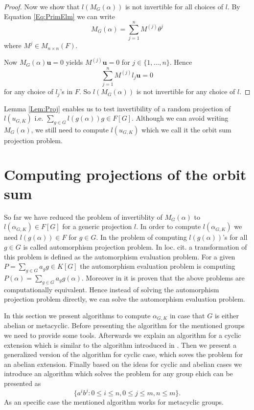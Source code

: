 \documentclass[sigconf]{acmart}
\newcommand{\osum}[2]{\alpha_{#1,#2}}
\theoremstyle{acmplain}
\begin{document}
\begin{proof}
 
 Now we show that $l(M_G(\alpha))$ is not invertible for all
 choices of $l$. By Equation \ref{Eq:PrimElm} we can write 
 $$M_G(\alpha) = \sum_{j = 1}^n M^{(j)} \theta^j$$ 
 where $M^{j} \in M_{n \times n}(F)$. 
 
 Now $M_G(\alpha) \textbf{u} =0$ yields $M^{(j)}\textbf{u} = 0$ for $j \in \lbrace 1, \ldots , n \rbrace$. Hence
 $$\sum_{j = 1}^n M^{(j)} l_j \textbf{u} = 0$$ for any choice of $l_j$'s in $F$. So $l(M_G(\alpha))$ is not invertible for any choice of $l$.
\end{proof} 
Lemma \ref{Lem:Proj} enables us to test invertibility of a random projection of $l(u_{G,K}) $ i.e. $\sum_{g \in G}
 l(g(\alpha))g \in F[G]$. Although we can avoid writing $M_G(\alpha)$, we still need to compute $l(u_{G,K})$ which
 we call it the orbit sum projection problem.


\section{Computing projections of the orbit sum}\label{sec:osum}

So far we have reduced the problem of invertiblity of $M_G(\alpha)$ to $l(\osum{G}{K}) \in F[G]$ for a generic
projection $l$. In order to compute $l(\osum{G}{K})$ we need $l(g(\alpha)) \in F$ for $g \in G$. In \cite{Kaltofen} the problem of
computing $l(g(\alpha))$'s for all $g \in G$ is called automorphism projection problem. In loc. cit. a transformation of this problem
is defined as the automorphism evaluation problem. For a given $P = \sum_{g \in G}a_g g \in K[G]$ the automorphism evaluation problem
is computing $P(\alpha) = \sum_{g \in G}a_g g(\alpha)$. Moreover in \cite{Kaltofen} it is proven that the above problems are
 computationally equivalent. Hence instead of solving the automorphism projection problem directly, we can solve the automorphism
 evaluation problem.

In this section we present algorithms to compute $\osum{G}{K}$ in case that $G$ is either abelian or metacyclic. 
Before presenting the algorithm for the mentioned groups we need to provide some tools. Afterwards we explain an algorithm
for a cyclic extension which is similar to the algorithm introduced in \cite{Kaltofen}. Then we present a generalized version 
of the algorithm for cyclic case, which soves the problem for an abelian extension. Finally based on the ideas for cyclic and 
abelian cases we introduce an algorithm which solves the problem for any group ehich can be presented as 
$$\lbrace a^ib^j: 0 \leq i \leq n,  0\leq j \leq m, n \leq m \rbrace.$$ 
As an specific case the mentioned algorithm works for metacyclic groups.
\end{document}
